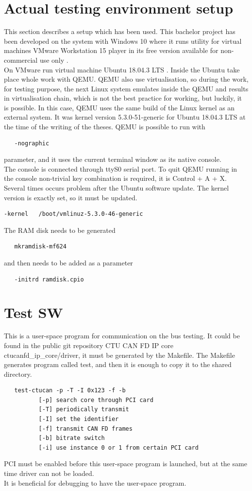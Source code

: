 \documentclass{ctuthesis}
\begin{document}
 \section{Actual testing environment setup}
  This section describes a setup which has been used. This bachelor project has been developed on the system with Windows 10 where it runs utility for virtual machines VMware  Workstation 15 player in its free version available for non-commercial use only \cite{vmware}. \\
  On VMware run virtual machine Ubuntu 18.04.3 LTS \cite{ubuntu}. Inside the Ubuntu take place whole work with QEMU. QEMU also use virtualisation, so during the work, for testing purpose, the next Linux system emulates inside the QEMU and results in virtualisation chain, which is not the best practice for working, but luckily, it is possible. In this case, QEMU uses the same build of the Linux kernel as an external system. It was kernel version 5.3.0-51-generic for Ubuntu 18.04.3 LTS at the time of the writing of the theses. QEMU is possible to run with
  \begin{verbatim}   -nographic\end{verbatim}
  parameter, and it uses the current terminal window as its native console. \\
  The console is connected through ttyS0 serial port. To quit QEMU running in the console non-trivial key combination is required, it is Control + A + X. Several times occurs problem after the Ubuntu software update. The kernel version is exactly set, so it must be updated.
  \begin{verbatim}-kernel   /boot/vmlinuz-5.3.0-46-generic\end{verbatim}
  The RAM disk needs to be generated
  \begin{verbatim}   mkramdisk-mf624\end{verbatim}
  and then needs to be added as a parameter 
  \begin{verbatim}   -initrd ramdisk.cpio\end{verbatim}
 \section{Test SW}
 This is a user-space program for communication on the bus testing. It could be found in the public git repository CTU CAN FD IP core \cite{driver-repo} ctucanfd\_ip\_core/driver, it must be generated by the Makefile. The Makefile generates program called test, and then it is enough to copy it to the shared directory.
 \begin{verbatim}   test-ctucan -p -T -I 0x123 -f -b
          [-p] search core through PCI card
          [-T] periodically transmit
          [-I] set the identifier
          [-f] transmit CAN FD frames
          [-b] bitrate switch
          [-i] use instance 0 or 1 from certain PCI card\end{verbatim}
 PCI must be enabled before this user-space program is launched, but at the same time driver can not be loaded. \\
 It is beneficial for debugging to have the user-space program.
 
\end{document}
